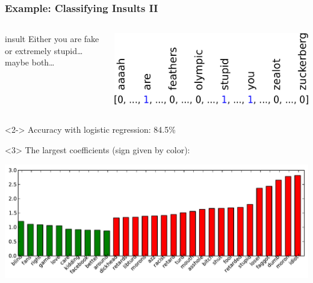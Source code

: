 \begin{frame}[t]
    \frametitle{Example: Classifying Insults II}
    \begin{columns}[t]
            \begin{beamercolorbox}[sep=1em,wd=5cm]{insult}
                Either you are fake or extremely stupid\dots maybe both\dots\\
            \end{beamercolorbox}
            \includegraphics[width=.9\linewidth]{logreg-pics/bag_of_words-crop}\\
            
    \end{columns}
    \vspace{3mm}
    \begin{onlyenv}<2->
        Accuracy with logistic regression: 84.5\%\\
    \end{onlyenv}
    \vspace{3mm}
    \begin{onlyenv}<3>
        The largest coefficients (sign given by color):
        \begin{center}
            \includegraphics[width=.9\linewidth]{logreg-pics/bow_coef}
        \end{center}
    \end{onlyenv}
\end{frame}

